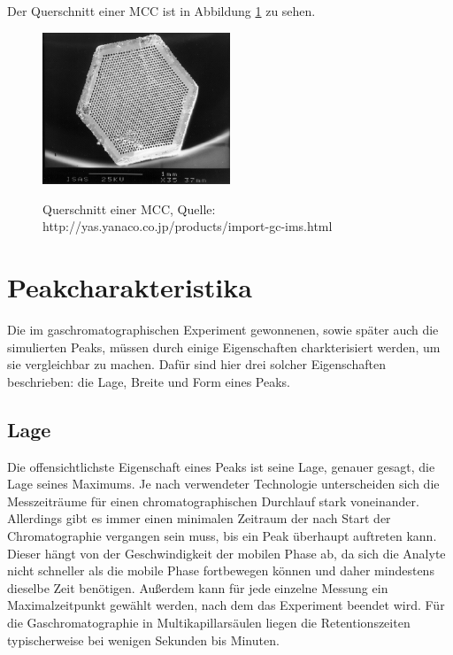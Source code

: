 Der Querschnitt einer MCC ist in Abbildung \ref{MCC} zu sehen.

\begin{figure}[h]
 \centering
  \includegraphics[width = 0.5\textwidth]{bilder/MultiCapillaryColumn}\\
  \caption[Querschnitt einer MCC]{Querschnitt einer MCC, Quelle: http://yas.yanaco.co.jp/products/import-gc-ims.html}
  \label{MCC}
\end{figure}

\section{Peakcharakteristika}
Die im gaschromatographischen Experiment gewonnenen, sowie später auch die simulierten Peaks, müssen durch einige Eigenschaften charkterisiert werden, um sie vergleichbar zu machen. Dafür sind hier drei solcher Eigenschaften beschrieben: die Lage, Breite und Form eines Peaks.


\subsection{Lage}
Die offensichtlichste Eigenschaft eines Peaks ist seine Lage, genauer gesagt, die Lage seines Maximums. Je nach verwendeter Technologie unterscheiden sich die Messzeiträume für einen chromatographischen Durchlauf stark voneinander. %
Allerdings gibt es immer einen minimalen Zeitraum der nach Start der Chromatographie vergangen sein muss, bis ein Peak überhaupt auftreten kann. Dieser hängt von der Geschwindigkeit der mobilen Phase ab, da sich die Analyte nicht schneller als die mobile Phase fortbewegen können und daher mindestens dieselbe Zeit benötigen. Außerdem kann für jede einzelne Messung ein Maximalzeitpunkt gewählt werden, nach dem das Experiment beendet wird.
Für die Gaschromatographie in Multikapillarsäulen liegen die Retentionszeiten typischerweise bei wenigen Sekunden bis Minuten.


